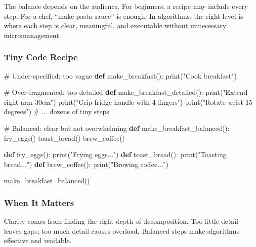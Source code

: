 \documentclass[
  letterpaper,
  DIV=11,
  numbers=noendperiod]{scrreprt}
\newenvironment{Shaded}{\begin{snugshade}}{\end{snugshade}}
\newcommand{\BuiltInTok}[1]{\textcolor[rgb]{0.00,0.23,0.31}{#1}}
\newcommand{\CommentTok}[1]{\textcolor[rgb]{0.37,0.37,0.37}{#1}}
\newcommand{\KeywordTok}[1]{\textcolor[rgb]{0.00,0.23,0.31}{\textbf{#1}}}
\newcommand{\NormalTok}[1]{\textcolor[rgb]{0.00,0.23,0.31}{#1}}
\newcommand{\StringTok}[1]{\textcolor[rgb]{0.13,0.47,0.30}{#1}}
\begin{document}
The balance depends on the audience. For beginners, a recipe may include
every step. For a chef, ``make pasta sauce'' is enough. In algorithms,
the right level is where each step is clear, meaningful, and executable
without unnecessary micromanagement.

\subsubsection{Tiny Code Recipe}\label{tiny-code-recipe-36}

\begin{Shaded}
\begin{Highlighting}[]
\CommentTok{\# Under{-}specified: too vague}
\KeywordTok{def}\NormalTok{ make\_breakfast():}
    \BuiltInTok{print}\NormalTok{(}\StringTok{"Cook breakfast"}\NormalTok{)  }

\CommentTok{\# Over{-}fragmented: too detailed}
\KeywordTok{def}\NormalTok{ make\_breakfast\_detailed():}
    \BuiltInTok{print}\NormalTok{(}\StringTok{"Extend right arm 30cm"}\NormalTok{)}
    \BuiltInTok{print}\NormalTok{(}\StringTok{"Grip fridge handle with 4 fingers"}\NormalTok{)}
    \BuiltInTok{print}\NormalTok{(}\StringTok{"Rotate wrist 15 degrees"}\NormalTok{)}
    \CommentTok{\# ... dozens of tiny steps}

\CommentTok{\# Balanced: clear but not overwhelming}
\KeywordTok{def}\NormalTok{ make\_breakfast\_balanced():}
\NormalTok{    fry\_eggs()}
\NormalTok{    toast\_bread()}
\NormalTok{    brew\_coffee()}

\KeywordTok{def}\NormalTok{ fry\_eggs(): }\BuiltInTok{print}\NormalTok{(}\StringTok{"Frying eggs..."}\NormalTok{)}
\KeywordTok{def}\NormalTok{ toast\_bread(): }\BuiltInTok{print}\NormalTok{(}\StringTok{"Toasting bread..."}\NormalTok{)}
\KeywordTok{def}\NormalTok{ brew\_coffee(): }\BuiltInTok{print}\NormalTok{(}\StringTok{"Brewing coffee..."}\NormalTok{)}

\NormalTok{make\_breakfast\_balanced()}
\end{Highlighting}
\end{Shaded}

\subsubsection{When It Matters}\label{when-it-matters-36}

Clarity comes from finding the right depth of decomposition. Too little
detail leaves gaps; too much detail causes overload. Balanced steps make
algorithms effective and readable.
\end{document}
